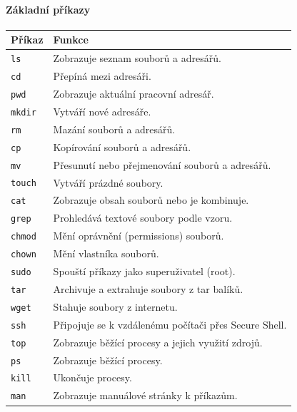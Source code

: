 \paragraph{Základní příkazy}
\begin{center}
\begin{tabular}{|l|p{8cm}|}
\hline
\textbf{Příkaz} & \textbf{Funkce} \\
\hline
\texttt{ls} & Zobrazuje seznam souborů a adresářů. \\
\hline
\texttt{cd} & Přepíná mezi adresáři. \\
\hline
\texttt{pwd} & Zobrazuje aktuální pracovní adresář. \\
\hline
\texttt{mkdir} & Vytváří nové adresáře. \\
\hline
\texttt{rm} & Mazání souborů a adresářů. \\
\hline
\texttt{cp} & Kopírování souborů a adresářů. \\
\hline
\texttt{mv} & Přesunutí nebo přejmenování souborů a adresářů. \\
\hline
\texttt{touch} & Vytváří prázdné soubory. \\
\hline
\texttt{cat} & Zobrazuje obsah souborů nebo je kombinuje. \\
\hline
\texttt{grep} & Prohledává textové soubory podle vzoru. \\
\hline
\texttt{chmod} & Mění oprávnění (permissions) souborů. \\
\hline
\texttt{chown} & Mění vlastníka souborů. \\
\hline
\texttt{sudo} & Spouští příkazy jako superuživatel (root). \\
\hline
\texttt{tar} & Archivuje a extrahuje soubory z tar balíků. \\
\hline
\texttt{wget} & Stahuje soubory z internetu. \\
\hline
\texttt{ssh} & Připojuje se k vzdálenému počítači přes Secure Shell. \\
\hline
\texttt{top} & Zobrazuje běžící procesy a jejich využití zdrojů. \\
\hline
\texttt{ps} & Zobrazuje běžící procesy. \\
\hline
\texttt{kill} & Ukončuje procesy. \\
\hline
\texttt{man} & Zobrazuje manuálové stránky k příkazům. \\
\hline
\end{tabular}
\end{center}

